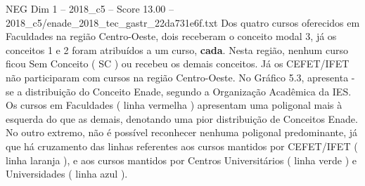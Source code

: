 \begin{textsample}{NEG Dim 1 – 2018\_c5 – Score 13.00 – 2018\_c5/enade\_2018\_tec\_gastr\_22da731e6f.txt}
Dos quatro cursos oferecidos em Faculdades na região Centro-Oeste, dois receberam o conceito modal 3, já os conceitos 1 e 2 foram atribuídos a um curso, \textbf{cada}.
Nesta região, nenhum curso ficou Sem Conceito ( SC ) ou recebeu os demais conceitos.
Já os CEFET/IFET não participaram com cursos na região Centro-Oeste.
No Gráfico 5.3, apresenta -se a distribuição do Conceito Enade, segundo a Organização Acadêmica da IES.
Os cursos em Faculdades ( linha vermelha ) apresentam uma poligonal mais à esquerda do que as demais, denotando uma pior distribuição de Conceitos Enade.
No outro extremo, não é possível reconhecer nenhuma poligonal predominante, já que há cruzamento das linhas referentes aos cursos mantidos por CEFET/IFET ( linha laranja ), e aos cursos mantidos por Centros Universitários ( linha verde ) e Universidades ( linha azul ).

\end{textsample}
